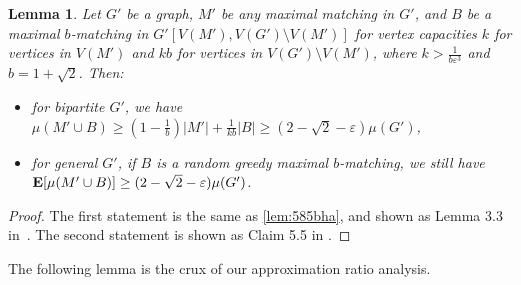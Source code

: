 \documentclass[letterpaper,11pt]{article}
\renewcommand{\epsilon}{\varepsilon}
\DeclareMathOperator{\E}{\ensuremath{\normalfont \textbf{E}}}
\newtheorem{lemma}{Lemma}[section]
\begin{document}
\begin{lemma}
    \label{lem:585}
    Let $G'$ be a graph,
    $M'$ be any maximal matching in $G'$,
    and $B$ be a maximal $b$-matching in $G'[V(M'), V(G') \setminus V(M')]$
    for vertex capacities $k$ for vertices in $V(M')$
    and $kb$ for vertices in $V(G') \setminus V(M')$,
    where $k > \frac{1}{b \epsilon^3}$
    and $b = 1 + \sqrt{2}$.
    Then:
    \begin{itemize}
        \item for bipartite $G'$, we have $\mu(M' \cup B) \ge (1-\frac{1}{b})|M'|+\frac{1}{kb}|B| \ge (2-\sqrt{2}-\epsilon)\mu(G')$,
        \item 
        for general $G'$, if $B$ is a \emph{random greedy} maximal $b$-matching,
        we still have $\E[\mu(M' \cup B)] \ge (2-\sqrt{2}-\epsilon)\mu(G')$.
    \end{itemize}
\end{lemma}
\begin{proof}
    The first statement is the same as \cref{lem:585bha}, and shown as Lemma 3.3 in~\cite{BhattacharyaKSW23}.
    The second statement is shown as Claim 5.5 in \cite{AzarmehrBR24}.
\end{proof}

The following lemma is the crux of our approximation ratio analysis.
\end{document}
